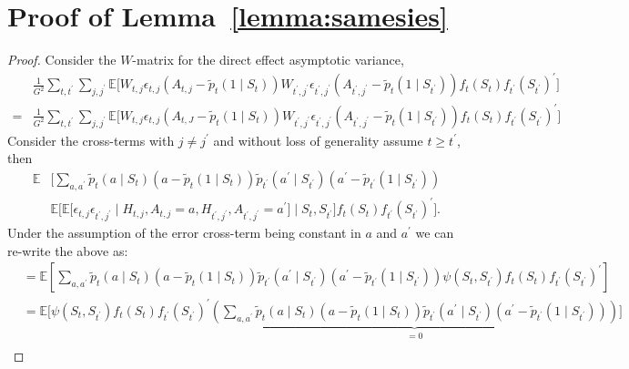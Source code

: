 \documentclass[12pt]{article}
\begin{document}
\section{Proof of Lemma~\ref{lemma:samesies}}
\label{app:samesies}

\begin{proof}
Consider the $W$-matrix for the direct effect asymptotic variance,
\begin{align*}
 &\frac{1}{G^2} \sum_{t, t^\prime} \sum_{j, j^\prime} \mathbb{E} \bigg[
 W_{t,j} \epsilon_{t,j} (A_{t,j} - \tilde{p}_t( 1 \mid S_t))
 W_{t^\prime,j^\prime} \epsilon_{t^\prime,j^\prime} (A_{t^\prime,j^\prime} - \tilde{p}_t( 1 \mid S_{t^\prime}))
 f_t(S_t) f_{t^\prime}(S_{t^\prime})^\prime
                  \bigg] \\
=&\frac{1}{G^2} \sum_{t, t^\prime}\sum_{j, j^\prime} \mathbb{E} \bigg[
 W_{t,j} \epsilon_{t,j} (A_{t,J} - \tilde{p}_t( 1 \mid S_t))
 W_{t^\prime,j^\prime} \epsilon_{t^\prime,j^\prime} (A_{t^\prime,j^\prime} - \tilde{p}_t( 1 \mid S_{t^\prime}))
 f_t(S_t) f_{t^\prime}(S_{t^\prime})^\prime
                  \bigg]
\end{align*}
Consider the cross-terms with $j \neq j^\prime$ and without loss of generality assume $t \geq t^\prime$, then
\begin{align*}
\mathbb{E} &\bigg[ \sum_{a, a^\prime}  \tilde p_t (a \mid S_t) (a - \tilde{p}_t( 1 \mid S_t))
\tilde p_{t^\prime} (a^\prime \mid S_{t^\prime}) (a^\prime - \tilde p_{t^\prime} (1 \mid S_{t^\prime})) \\
&\mathbb{E} \bigg[ \mathbb{E} \bigg[ \epsilon_{t,j} \epsilon_{t^\prime,j^\prime} \mid H_{t,j}, A_{t,j} = a, H_{t^\prime,j^\prime}, A_{t^\prime,j^\prime} = a^\prime \bigg] \mid S_t, S_{t^\prime} \bigg] f_t(S_t) f_{t^\prime}(S_{t^\prime})^\prime
                  \bigg].
\end{align*}
Under the assumption of the error cross-term being constant in $a$ and $a^\prime$ we can re-write the above as:
\begin{align*}
&= \mathbb{E} \left[ \sum_{a, a^\prime}  \tilde p_t (a \mid S_t) (a - \tilde{p}_t( 1 \mid S_t))
\tilde p_{t^\prime} (a^\prime \mid S_{t^\prime}) (a^\prime - \tilde p_{t^\prime} (1 \mid S_{t^\prime})) \psi (S_t, S_{t^\prime}) f_t (S_t) f_{t^\prime} (S_{t^\prime})^\prime \right] \\
&= \mathbb{E} \bigg[ \psi (S_t, S_{t^\prime}) f_t (S_t) f_{t^\prime} (S_{t^\prime})^\prime \underbrace{\left( \sum_{a, a^\prime}  \tilde p_t (a \mid S_t) (a - \tilde{p}_t( 1 \mid S_t))
\tilde p_{t^\prime} (a^\prime \mid S_{t^\prime}) (a^\prime - \tilde p_{t^\prime} (1 \mid S_{t^\prime})) \right)}_{=0} \bigg] \\

\end{align*}
\end{proof}
\end{document}

